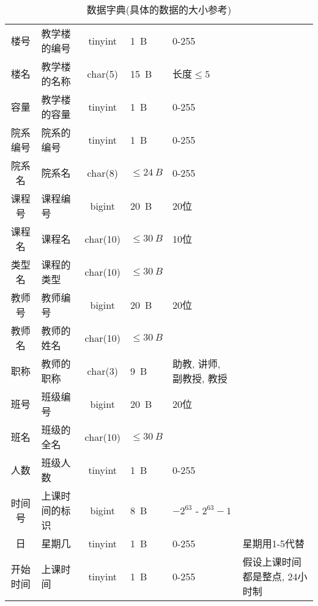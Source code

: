 \documentclass{myreport}
\begin{document}
      \begin{longtabu} to \textwidth {clcXXX}
        \caption{数据字典(具体的数据的大小参考\cite{tinyint})}
        \label{t:data_dict} \\
        \toprule[1.5pt]
            &
           &
           &
           &
           &
           \\
        \midrule[1pt]
        \endhead

        \bottomrule[1.5pt]
        \endfoot


          楼号    & 教学楼的编号 & tinyint & \SI{1}{B} & 0-255 & \\
          楼名    & 教学楼的名称 & char(5) & \SI{15}{B} & 长度$\le 5$ & \\
          容量    & 教学楼的容量 & tinyint & \SI{1}{B} & 0-255 & \\
          院系编号 & 院系的编号 & tinyint & \SI{1}{B} & 0-255 & \\
          院系名   & 院系名 & char(8) & $\le\SI{24}{B}$ & 0-255 & \\
          课程号   & 课程编号 & bigint & \SI{20}{B} & 20位 & \\
          课程名   & 课程名 & char(10) & $\le \SI{30}{B}$ & 10位 & \\
          类型名   & 课程的类型 & char(10) & $\le \SI{30}{B}$ & \\
          教师号   & 教师编号 & bigint & \SI{20}{B} & 20位 & \\
          教师名   & 教师的姓名 & char(10) & $\le \SI{30}{B}$ & \\
          职称     & 教师的职称 & char(3) &\SI{9}{B}  & 助教, 讲师, 副教授, 教授 \\
          班号     & 班级编号 & bigint & \SI{20}{B} & 20位 & \\
          班名     & 班级的全名 & char(10) & $\le \SI{30}{B}$ & \\
          人数     & 班级人数 & tinyint & \SI{1}{B} & 0-255 & \\
          时间号   & 上课时间的标识 & bigint & \SI{8}{B} & $-2^{63}$ - $2^{63}-1$ & \\
          日       & 星期几 & tinyint & \SI{1}{B} & 0-255 & 星期用1-5代替\\
          开始时间 & 上课时间 & tinyint & \SI{1}{B} & 0-255 & 假设上课时间都是整点, 24小时制\\

\end{longtabu}
\end{document}
